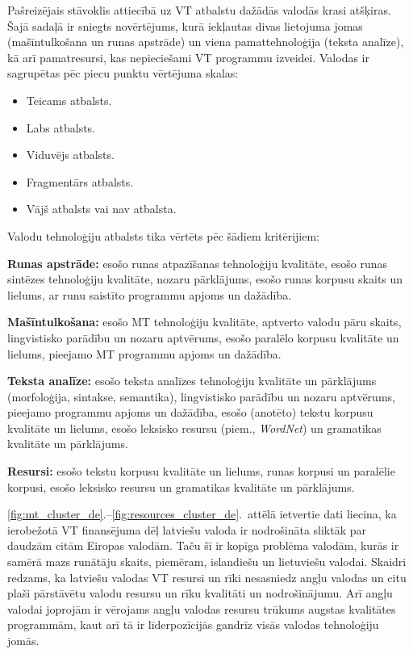 \begin{multicols}{2}
Pašreizējais stāvoklis attiecībā uz VT atbalstu dažādās valodās krasi atšķiras.
Šajā sadaļā ir sniegts novērtējums, kurā iekļautas divas lietojuma jomas (mašīntulkošana un runas apstrāde) un viena pamattehnoloģija (teksta analīze), kā arī pamatresursi, kas nepieciešami VT programmu izveidei.
Valodas ir sagrupētas pēc piecu punktu vērtējuma skalas:

\begin{itemize}
\item Teicams atbalsts.
\item Labs atbalsts.
\item Viduvējs atbalsts.
\item Fragmentārs atbalsts.
\item Vājš atbalsts vai nav atbalsta.
\end{itemize}

Valodu tehnoloģiju atbalsts tika vērtēts pēc šādiem kritērijiem:

\textbf{Runas apstrāde:} esošo runas atpazīšanas tehnoloģiju kvalitāte, esošo runas sintēzes tehnoloģiju kvalitāte, nozaru pārklājums, esošo runas korpusu skaits un lielums, ar runu saistīto programmu apjoms un dažādība.

\textbf{Mašīntulkošana:} esošo MT tehnoloģiju kvalitāte, aptverto valodu pāru skaits, lingvistisko parādību un nozaru aptvērums, esošo paralēlo korpusu kvalitāte un lielums, pieejamo MT programmu apjoms un dažādība.

\textbf{Teksta analīze:} esošo teksta analīzes tehnoloģiju kvalitāte un pārklājums (morfoloģija, sintakse, semantika), lingvistisko parādību un nozaru aptvērums, pieejamo programmu apjoms un dažādība, esošo (anotēto) tekstu korpusu kvalitāte un lielums, esošo leksisko resursu (piem., \textit{WordNet}) un gramatikas kvalitāte un pārklājums.

\textbf{Resursi:} esošo tekstu korpusu kvalitāte un lielums, runas korpusi un paralēlie korpusi, esošo leksisko resursu un gramatikas kvalitāte un pārklājums.

\ref{fig:mt_cluster_de}.--\ref{fig:resources_cluster_de}.~attēlā ietvertie dati liecina, ka ierobežotā VT finansējuma dēļ latviešu valoda ir nodrošināta sliktāk par daudzām citām Eiropas valodām.  Taču šī ir kopīga problēma valodām, kurās ir samērā mazs runātāju skaits, piemēram, islandiešu un lietuviešu valodai.  Skaidri redzams, ka latviešu valodas VT resursi un rīki nesasniedz angļu valodas un citu plaši pārstāvētu valodu resursu un rīku kvalitāti un nodrošinājumu.  Arī angļu valodai joprojām ir vērojams angļu valodas resursu trūkums augstas kvalitātes programmām, kaut arī tā ir līderpozīcijās gandrīz visās valodas tehnoloģiju jomās.


\end{multicols}
